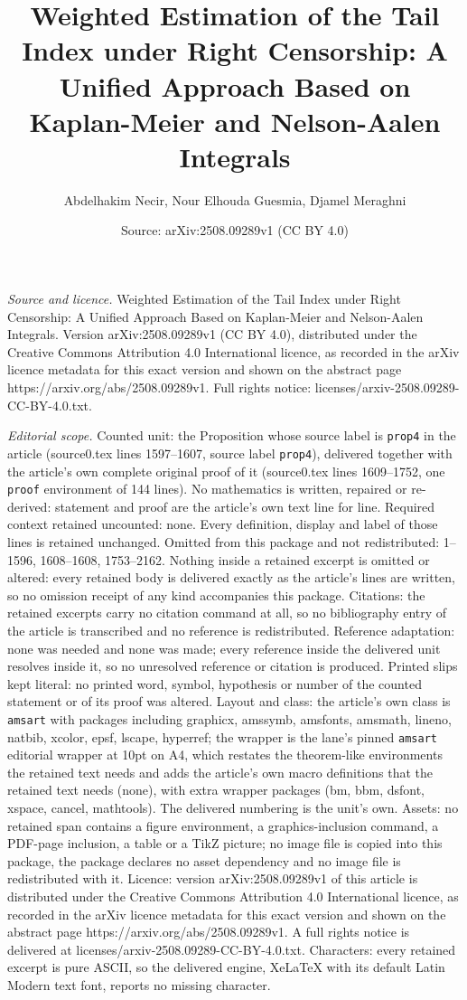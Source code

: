 \documentclass[10pt,a4paper]{amsart}
\title[Weighted Estimation of the Tail Index under Right Censorship]{Weighted Estimation of the Tail Index under Right Censorship: A Unified Approach Based on Kaplan-Meier and Nelson-Aalen Integrals}
\author{Abdelhakim Necir, Nour Elhouda Guesmia, Djamel Meraghni}
\date{Source: arXiv:2508.09289v1 (CC BY 4.0)}
\begin{document}
\maketitle

\noindent\emph{Source and licence.} Weighted Estimation of the Tail Index under Right Censorship: A Unified Approach Based on Kaplan-Meier and Nelson-Aalen Integrals. Version arXiv:2508.09289v1 (CC BY 4.0), distributed under the Creative Commons Attribution 4.0 International licence, as recorded in the arXiv licence metadata for this exact version and shown on the abstract page https://arxiv.org/abs/2508.09289v1. Full rights notice: licenses/arxiv-2508.09289-CC-BY-4.0.txt.\par\smallskip

\noindent\textit{Editorial scope.} Counted unit: the Proposition whose source label is \texttt{prop4} in the article (source0.tex lines 1597--1607, source label \texttt{prop4}), delivered together with the article's own complete original proof of it (source0.tex lines 1609--1752, one \texttt{proof} environment of 144 lines). No mathematics is written, repaired or re-derived: statement and proof are the article's own text line for line. Required context retained uncounted: none. Every definition, display and label of those lines is retained unchanged. Omitted from this package and not redistributed: 1--1596, 1608--1608, 1753--2162. Nothing inside a retained excerpt is omitted or altered: every retained body is delivered exactly as the article's lines are written, so no omission receipt of any kind accompanies this package. Citations: the retained excerpts carry no citation command at all, so no bibliography entry of the article is transcribed and no reference is redistributed. Reference adaptation: none was needed and none was made; every reference inside the delivered unit resolves inside it, so no unresolved reference or citation is produced. Printed slips kept literal: no printed word, symbol, hypothesis or number of the counted statement or of its proof was altered. Layout and class: the article's own class is \texttt{amsart} with packages including graphicx, amssymb, amsfonts, amsmath, lineno, natbib, xcolor, epsf, lscape, hyperref; the wrapper is the lane's pinned \texttt{amsart} editorial wrapper at 10pt on A4, which restates the theorem-like environments the retained text needs and adds the article's own macro definitions that the retained text needs (none), with extra wrapper packages (bm, bbm, dsfont, xspace, cancel, mathtools). The delivered numbering is the unit's own. Assets: no retained span contains a figure environment, a graphics-inclusion command, a PDF-page inclusion, a table or a TikZ picture; no image file is copied into this package, the package declares no asset dependency and no image file is redistributed with it. Licence: version arXiv:2508.09289v1 of this article is distributed under the Creative Commons Attribution 4.0 International licence, as recorded in the arXiv licence metadata for this exact version and shown on the abstract page https://arxiv.org/abs/2508.09289v1. A full rights notice is delivered at licenses/arxiv-2508.09289-CC-BY-4.0.txt. Characters: every retained excerpt is pure ASCII, so the delivered engine, XeLaTeX with its default Latin Modern text font, reports no missing character.
\end{document}
